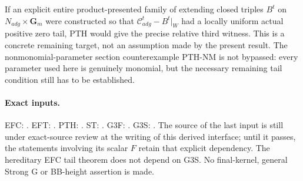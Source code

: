 If an explicit entire product-presented family of extending closed
triples $B^t$ on $N_{adg}\times\mathbf G_m$ were constructed so
that $\mathcal C^t_{adg}-B^t|_W$ had a locally uniform actual
positive zero tail, PTH would give the precise relative third
witness.  This is a concrete remaining target, not an assumption
made by the present result.  The nonmonomial-parameter section
counterexample PTH-NM is not bypassed: every parameter used here
is genuinely monomial, but the necessary remaining tail condition
still has to be established.

\paragraph{Exact inputs.}
EFC: .
EFT: .
PTH: .
ST: .
G3F: .
G3S: .
The source of the last input is still under exact-source review
at the writing of this derived interface; until it passes,
the statements involving its scalar $F$ retain that explicit
dependency.  The hereditary EFC tail theorem does not depend on
G3S.  No final-kernel, general Strong G or BB-height assertion is
made.
